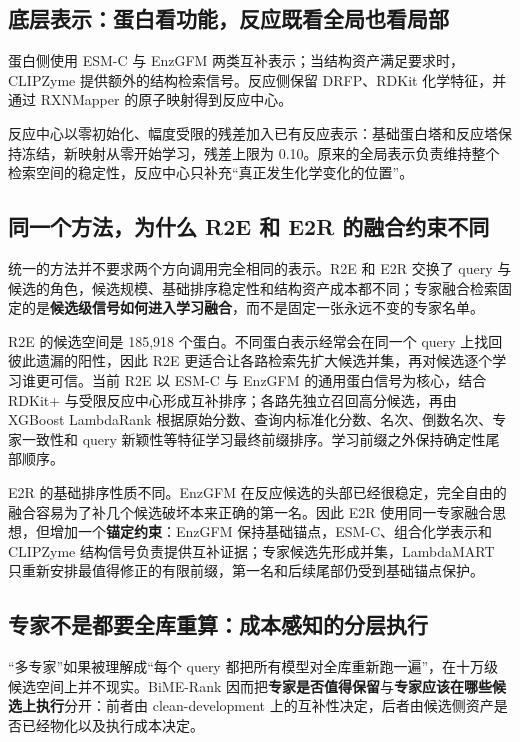 \documentclass[11pt,a4paper]{ctexart}
\begin{document}
\subsection{底层表示：蛋白看功能，反应既看全局也看局部}

蛋白侧使用 ESM-C 与 EnzGFM 两类互补表示\cite{esmc2024,enzgfm2026}；当结构资产满足要求时，CLIPZyme 提供额外的结构检索信号\cite{clipzyme2024}。反应侧保留 DRFP、RDKit 化学特征\cite{drfp2022,rdkit}，并通过 RXNMapper 的原子映射得到反应中心\cite{rxnmapper2021}。

反应中心以零初始化、幅度受限的残差加入已有反应表示：基础蛋白塔和反应塔保持冻结，新映射从零开始学习，残差上限为 0.10。原来的全局表示负责维持整个检索空间的稳定性，反应中心只补充“真正发生化学变化的位置”。

\subsection{同一个方法，为什么 R2E 和 E2R 的融合约束不同}

统一的方法并不要求两个方向调用完全相同的表示。R2E 和 E2R 交换了 query 与候选的角色，候选规模、基础排序稳定性和结构资产成本都不同；专家融合检索固定的是\textbf{候选级信号如何进入学习融合}，而不是固定一张永远不变的专家名单。

R2E 的候选空间是 185,918 个蛋白。不同蛋白表示经常会在同一个 query 上找回彼此遗漏的阳性，因此 R2E 更适合让各路检索先扩大候选并集，再对候选逐个学习谁更可信。当前 R2E 以 ESM-C 与 EnzGFM 的通用蛋白信号为核心，结合 RDKit+ 与受限反应中心形成互补排序；各路先独立召回高分候选，再由 XGBoost LambdaRank 根据原始分数、查询内标准化分数、名次、倒数名次、专家一致性和 query 新颖性等特征学习最终前缀排序\cite{xgboost2016,burges2010}。学习前缀之外保持确定性尾部顺序。

E2R 的基础排序性质不同。EnzGFM 在反应候选的头部已经很稳定，完全自由的融合容易为了补几个候选破坏本来正确的第一名。因此 E2R 使用同一专家融合思想，但增加一个\textbf{锚定约束}：EnzGFM 保持基础锚点，ESM-C、组合化学表示和 CLIPZyme 结构信号负责提供互补证据；专家候选先形成并集，LambdaMART 只重新安排最值得修正的有限前缀，第一名和后续尾部仍受到基础锚点保护。

\subsection{专家不是都要全库重算：成本感知的分层执行}

“多专家”如果被理解成“每个 query 都把所有模型对全库重新跑一遍”，在十万级候选空间上并不现实。BiME-Rank 因而把\textbf{专家是否值得保留}与\textbf{专家应该在哪些候选上执行}分开：前者由 clean-development 上的互补性决定，后者由候选侧资产是否已经物化以及执行成本决定。
\end{document}
